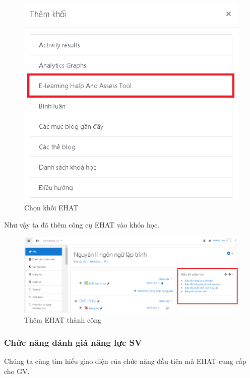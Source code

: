 \begin{center}
	\begin{figure}[htp]
		\begin{center}
			\includegraphics[width=0.6\linewidth]{img/37}
		\end{center}
		\caption{Chọn khối EHAT}
		\label{refhinh45}
	\end{figure}
\end{center}

Như vậy ta đã thêm công cụ EHAT vào khóa học.

\begin{center}
	\begin{figure}[htp]
		\begin{center}
			\includegraphics[width=1\linewidth]{img/39}
		\end{center}
		\caption{Thêm EHAT thành công}
		\label{refhinh47}
	\end{figure}
\end{center}

\newpage
\subsubsection*{Chức năng đánh giá năng lực SV}

Chúng ta cùng tìm hiểu giao diện của chức năng đầu tiên mà EHAT cung cấp cho GV.

